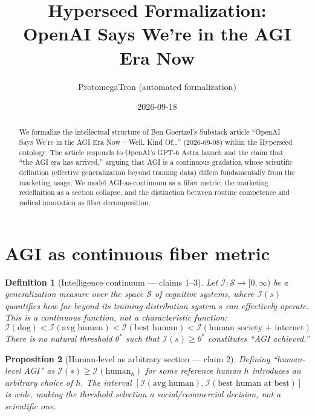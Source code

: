 \documentclass[11pt,a4paper]{article}
\title{Hyperseed Formalization:\\
  OpenAI Says We're in the AGI Era Now}
\author{ProtomegaTron (automated formalization)}
\date{2026-09-18}
\newtheorem{definition}{Definition}[section]
\newtheorem{proposition}[definition]{Proposition}
\begin{document}
\maketitle

\begin{abstract}
We formalize the intellectual structure of Ben Goertzel's Substack article
``OpenAI Says We're in the AGI Era Now -- Well, Kind Of\ldots''
(2026-09-08) within the Hyperseed ontology. The article responds to
OpenAI's GPT-6 Astra launch and the claim that ``the AGI era has arrived,''
arguing that AGI is a continuous gradation whose scientific definition
(effective generalization beyond training data) differs fundamentally from
the marketing usage. We model AGI-as-continuum as a fiber metric, the
marketing redefinition as a section collapse, and the distinction between
routine competence and radical innovation as fiber decomposition.
\end{abstract}

\tableofcontents

\section{AGI as continuous fiber metric}
\label{sec:continuum}

\begin{definition}[Intelligence continuum --- claims 1--3]
\label{def:continuum}
Let $\mathcal{I} : \mathcal{S} \to [0, \infty)$ be a generalization measure
over the space $\mathcal{S}$ of cognitive systems, where $\mathcal{I}(s)$
quantifies how far beyond its training distribution system $s$ can
effectively operate. This is a continuous function, not a characteristic
function:
\[
  \mathcal{I}(\text{dog}) < \mathcal{I}(\text{avg human})
  < \mathcal{I}(\text{best human}) < \mathcal{I}(\text{human society + internet})
\]
There is no natural threshold $\theta^*$ such that $\mathcal{I}(s) \geq \theta^*$
constitutes ``AGI achieved.''
\end{definition}

\begin{proposition}[Human-level as arbitrary section --- claim 2]
\label{prop:arbitrary}
Defining ``human-level AGI'' as $\mathcal{I}(s) \geq \mathcal{I}(\text{human}_h)$
for some reference human $h$ introduces an arbitrary choice of $h$. The
interval $[\mathcal{I}(\text{avg human}), \mathcal{I}(\text{best human at best})]$
is wide, making the threshold selection a social/commercial decision, not a
scientific one.
\end{proposition}
\end{document}

